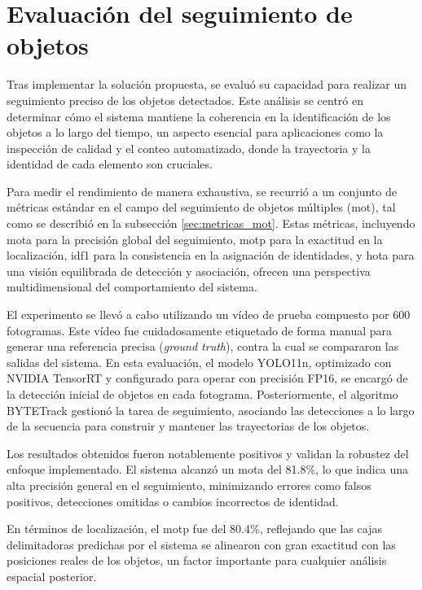\documentclass[11pt,spanish,listoffigures,listoftables]{tfgetsinf}
\begin{document}
\section{Evaluación del seguimiento de objetos} \label{sub:evaluacion_seguimiento_objetos}
Tras implementar la solución propuesta, se evaluó su capacidad para realizar un seguimiento preciso de los objetos detectados. Este análisis se centró en determinar cómo el sistema mantiene la coherencia en la identificación de los objetos a lo largo del tiempo, un aspecto esencial para aplicaciones como la inspección de calidad y el conteo automatizado, donde la trayectoria y la identidad de cada elemento son cruciales.

Para medir el rendimiento de manera exhaustiva, se recurrió a un conjunto de métricas estándar en el campo del seguimiento de objetos múltiples (\gls{mot}), tal como se describió en la subsección \ref{sec:metricas_mot}. Estas métricas, incluyendo \gls{mota} para la precisión global del seguimiento, \gls{motp} para la exactitud en la localización, \gls{idf1} para la consistencia en la asignación de identidades, y \gls{hota} para una visión equilibrada de detección y asociación, ofrecen una perspectiva multidimensional del comportamiento del sistema.

El experimento se llevó a cabo utilizando un vídeo de prueba compuesto por 600 fotogramas. Este vídeo fue cuidadosamente etiquetado de forma manual para generar una referencia precisa (\textit{ground truth}), contra la cual se compararon las salidas del sistema. En esta evaluación, el modelo YOLO11n, optimizado con NVIDIA TensorRT y configurado para operar con precisión FP16, se encargó de la detección inicial de objetos en cada fotograma. Posteriormente, el algoritmo BYTETrack\cite{zhang2022bytetrackmultiobjecttrackingassociating} gestionó la tarea de seguimiento, asociando las detecciones a lo largo de la secuencia para construir y mantener las trayectorias de los objetos.

Los resultados obtenidos fueron notablemente positivos y validan la robustez del enfoque implementado. El sistema alcanzó un \gls{mota} del 81.8\%, lo que indica una alta precisión general en el seguimiento, minimizando errores como falsos positivos, detecciones omitidas o cambios incorrectos de identidad.

En términos de localización, el \gls{motp} fue del 80.4\%, reflejando que las cajas delimitadoras predichas por el sistema se alinearon con gran exactitud con las posiciones reales de los objetos, un factor importante para cualquier análisis espacial posterior.
\end{document}
